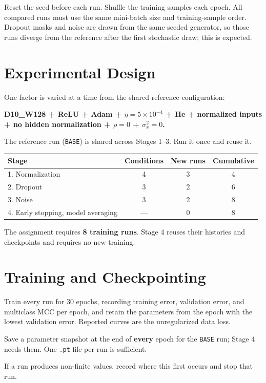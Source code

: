 \documentclass[11pt]{article}
\begin{document}
Reset the seed before each run. Shuffle the training samples each epoch. All compared runs must use the same mini-batch size and training-sample order. Dropout masks and noise are drawn from the same seeded generator, so those runs diverge from the reference after the first stochastic draw; this is expected.

\section{Experimental Design}
One factor is varied at a time from the shared reference configuration:

\begin{center}
\textbf{D10\_W128 + ReLU + Adam + $\eta=5\times10^{-4}$ + He + normalized inputs + no hidden normalization + $\rho=0$ + $\sigma_x^2=0$.}
\end{center}

The reference run (\texttt{BASE}) is shared across Stages 1--3. Run it once and reuse it.

\begin{center}
\begin{tabular}{lccc}
\toprule
Stage & Conditions & New runs & Cumulative \\
\midrule
1. Normalization & 4 & 3 & 4 \\
2. Dropout & 3 & 2 & 6 \\
3. Noise & 3 & 2 & 8 \\
4. Early stopping, model averaging & --- & 0 & 8 \\
\bottomrule
\end{tabular}
\end{center}

The assignment requires \textbf{8 training runs}. Stage 4 reuses their histories and checkpoints and requires no new training.

\section{Training and Checkpointing}
Train every run for 30 epochs, recording training error, validation error, and multiclass MCC per epoch, and retain the parameters from the epoch with the lowest validation error. Reported curves are the unregularized data loss.

Save a parameter snapshot at the end of \textbf{every} epoch for the \texttt{BASE} run; Stage 4 needs them. One \texttt{.pt} file per run is sufficient.

If a run produces non-finite values, record where this first occurs and stop that run.
\end{document}
